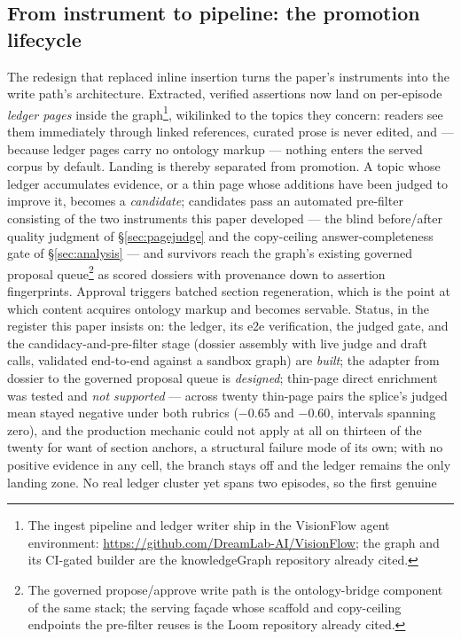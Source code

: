 \documentclass[10pt,twocolumn]{article}
\begin{document}
\subsection{From instrument to pipeline: the promotion lifecycle}\label{sec:lifecycle}
The redesign that replaced inline insertion turns the paper's instruments into the write path's
architecture. Extracted, verified assertions now land on per-episode \emph{ledger pages} inside
the graph\footnote{The ingest pipeline and ledger writer ship in the VisionFlow agent
environment: \url{https://github.com/DreamLab-AI/VisionFlow}; the graph and its CI-gated
builder are the knowledgeGraph repository already cited.}, wikilinked to the topics they concern: readers see them immediately through linked
references, curated prose is never edited, and --- because ledger pages carry no ontology
markup --- nothing enters the served corpus by default. Landing is thereby separated from
promotion. A topic whose ledger accumulates evidence, or a thin page whose additions have been
judged to improve it, becomes a \emph{candidate}; candidates pass an automated pre-filter
consisting of the two instruments this paper developed --- the blind before/after quality
judgment of \S\ref{sec:pagejudge} and the copy-ceiling answer-completeness gate of
\S\ref{sec:analysis} --- and survivors reach the graph's existing governed proposal queue\footnote{The governed
propose/approve write path is the ontology-bridge component of the same stack; the serving
fa\c{c}ade whose scaffold and copy-ceiling endpoints the pre-filter reuses is the Loom
repository already cited.} as scored dossiers with provenance down to assertion fingerprints. Approval triggers batched
section regeneration, which is the point at which content acquires ontology markup and becomes
servable. Status, in the register this paper insists on: the ledger, its e2e verification, the judged
gate, and the candidacy-and-pre-filter stage (dossier assembly with live judge and draft calls,
validated end-to-end against a sandbox graph) are \emph{built}; the adapter from dossier to the
governed proposal queue is \emph{designed}; thin-page direct enrichment was tested and \emph{not
supported} --- across twenty thin-page pairs the splice's judged mean stayed negative under both
rubrics ($-0.65$ and $-0.60$, intervals spanning zero), and the production mechanic could not
apply at all on thirteen of the twenty for want of section anchors, a structural failure mode of
its own; with no positive evidence in any cell, the branch stays off and the ledger remains the
only landing zone. No real ledger cluster yet spans two episodes, so the first genuine
\end{document}
